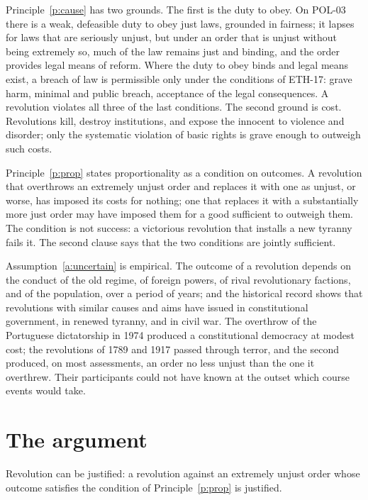 \documentclass{situationist-preprint}
\begin{document}
Principle~\ref{p:cause} has two grounds. The first is the duty to obey. On POL-03 there is a weak, defeasible duty to obey just laws, grounded in fairness; it lapses for laws that are seriously unjust, but under an order that is unjust without being extremely so, much of the law remains just and binding, and the order provides legal means of reform. Where the duty to obey binds and legal means exist, a breach of law is permissible only under the conditions of ETH-17: grave harm, minimal and public breach, acceptance of the legal consequences. A revolution violates all three of the last conditions. The second ground is cost. Revolutions kill, destroy institutions, and expose the innocent to violence and disorder; only the systematic violation of basic rights is grave enough to outweigh such costs.

Principle~\ref{p:prop} states proportionality as a condition on outcomes. A revolution that overthrows an extremely unjust order and replaces it with one as unjust, or worse, has imposed its costs for nothing; one that replaces it with a substantially more just order may have imposed them for a good sufficient to outweigh them. The condition is not success: a victorious revolution that installs a new tyranny fails it. The second clause says that the two conditions are jointly sufficient.

Assumption~\ref{a:uncertain} is empirical. The outcome of a revolution depends on the conduct of the old regime, of foreign powers, of rival revolutionary factions, and of the population, over a period of years; and the historical record shows that revolutions with similar causes and aims have issued in constitutional government, in renewed tyranny, and in civil war. The overthrow of the Portuguese dictatorship in 1974 produced a constitutional democracy at modest cost; the revolutions of 1789 and 1917 passed through terror, and the second produced, on most assessments, an order no less unjust than the one it overthrew. Their participants could not have known at the outset which course events would take.

\section{The argument}

\begin{theorem}\label{t:yes}
Revolution can be justified: a revolution against an extremely unjust order whose outcome satisfies the condition of Principle~\ref{p:prop} is justified.
\end{theorem}
\end{document}
